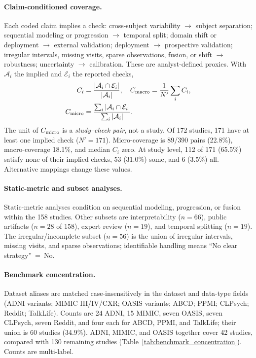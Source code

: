 \documentclass[11pt]{article}
\theoremstyle{plain}
\theoremstyle{definition}
\theoremstyle{remark}
\begin{document}
\paragraph{Claim-conditioned coverage.} Each coded claim implies a check: cross-subject variability $\rightarrow$ subject separation; sequential modeling or progression $\rightarrow$ temporal split; domain shift or deployment $\rightarrow$ external validation; deployment $\rightarrow$ prospective validation; irregular intervals, missing visits, sparse observations, fusion, or shift $\rightarrow$ robustness; uncertainty $\rightarrow$ calibration. These are analyst-defined proxies. With $\mathcal A_i$ the implied and $\mathcal E_i$ the reported checks,
\begin{align*}
C_i&=\frac{|\mathcal A_i\cap\mathcal E_i|}{|\mathcal A_i|},\quad
C_{\rm macro}=\frac{1}{N'}\sum_i C_i,\\
C_{\rm micro}&=\frac{\sum_i|\mathcal A_i\cap\mathcal E_i|}{\sum_i|\mathcal A_i|}.
\end{align*}
The unit of $C_{\rm micro}$ is a \emph{study--check pair}, not a study. Of 172 studies, 171 have at least one implied check ($N'=171$). Micro-coverage is 89/390 pairs (22.8\%), macro-coverage 18.1\%, and median $C_i$ zero. At study level, 112 of 171 (65.5\%) satisfy none of their implied checks, 53 (31.0\%) some, and 6 (3.5\%) all. Alternative mappings change these values.

\paragraph{Static-metric and subset analyses.} Static-metric analyses condition on sequential modeling, progression, or fusion within the 158  studies. Other subsets are interpretability ($n=66$), public artifacts ($n=28$ of 158), expert review ($n=19$), and temporal splitting ($n=19$). The irregular/incomplete subset ($n=56$) is the union of irregular intervals, missing visits, and sparse observations; identifiable handling means ``No clear strategy''~=~No.

\paragraph{Benchmark concentration.} Dataset aliases are matched case-insensitively in the dataset and data-type fields (ADNI variants; MIMIC-III/IV/CXR; OASIS variants; ABCD; PPMI; CLPsych; Reddit; TalkLife). Counts are 24 ADNI, 15 MIMIC, seven OASIS, seven CLPsych, seven Reddit, and four each for ABCD, PPMI, and TalkLife; their union is 60 studies (34.9\%). ADNI, MIMIC, and OASIS together cover 42 studies, compared with 130 remaining studies (Table~\ref{tab:benchmark_concentration}). Counts are multi-label.
\end{document}
